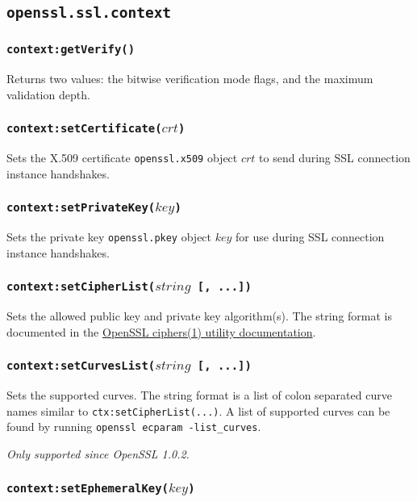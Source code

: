 \documentclass[11pt, oneside]{memoir}
\newcommand*{\fn}[1]{\texttt{#1}\xspace}
\newcommand*{\module}[1]{\texttt{#1}\xspace}
\newcounter{toccols}
\newenvironment{Module}[1]{
	\subsection{\texttt{#1}}
	\addtocontents{toc}{
		\protect\begin{multicols}{\value{toccols}}
	}
}{
	\addtocontents{toc}{\protect\end{multicols}}
}
\begin{document}
\begin{Module}{openssl.ssl.context}
\subsubsection[\fn{context:getVerify}]{\fn{context:getVerify()}}

Returns two values: the bitwise verification mode flags, and the maximum validation depth.

\subsubsection[\fn{context:setCertificate}]{\fn{context:setCertificate($crt$)}}

Sets the X.509 certificate \module{openssl.x509} object $crt$ to send during SSL connection instance handshakes.

\subsubsection[\fn{context:setPrivateKey}]{\fn{context:setPrivateKey($key$)}}

Sets the private key \module{openssl.pkey} object $key$ for use during SSL connection instance handshakes.

\subsubsection[\fn{context:setCipherList}]{\fn{context:setCipherList($string$ [, ...])}}

Sets the allowed public key and private key algorithm(s). The string format is documented in the \href{http://www.openssl.org/docs/apps/ciphers.html#CIPHER_LIST_FORMAT}{OpenSSL ciphers(1) utility documentation}.

\subsubsection[\fn{context:setCurvesList}]{\fn{context:setCurvesList($string$ [, ...])}}

Sets the supported curves. The string format is a list of colon separated curve names similar to \texttt{ctx:setCipherList(...)}. A list of supported curves can be found by running \texttt{openssl ecparam -list\_curves}.

\emph{Only supported since OpenSSL 1.0.2.}

\subsubsection[\fn{context:setEphemeralKey}]{\fn{context:setEphemeralKey($key$)}}


\end{Module}
\end{document}
